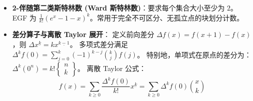 \begin{itemize}
    广义基底转换：$(x+r)^n = \sum_{k} \left\{ \begin{matrix} n+r \\ k+r \end{matrix} \right\}_r x^{\underline{k}}$。
    \item \textbf{2-伴随第二类斯特林数 (Ward 斯特林数)}：要求每个集合大小至少为 $2$。
    EGF 为 $\frac{1}{k!} (e^x - 1 - x)^k$。常用于完全不可区分、无孤立点的块划分计数。
    \item \textbf{差分算子与离散 Taylor 展开}：
    定义前向差分 $\Delta f(x) = f(x+1) - f(x)$，则 $\Delta x^{\underline{k}} = k x^{\underline{k-1}}$。
    多项式差分满足 $\Delta^k f(0) = \sum_{j=0}^k (-1)^{k-j} \binom{k}{j} f(j)$。
    特别地，单项式在原点的差分为：$\Delta^k (0^n) = k! \left\{ \begin{matrix} n \\ k \end{matrix} \right\}$。
    离散 Taylor 公式：
    \[
    f(x) = \sum_{k \ge 0} \frac{\Delta^k f(0)}{k!} x^{\underline{k}} = \sum_{k \ge 0} \Delta^k f(0) \binom{x}{k}
    \]
\end{itemize}
